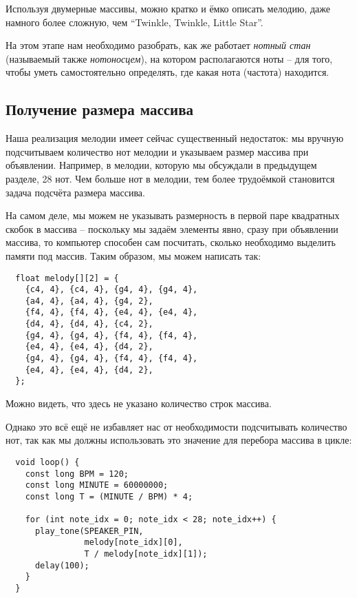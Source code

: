 \documentclass[../sparc.tex]{subfiles}
\begin{document}
Используя двумерные массивы, можно кратко и ёмко описать мелодию, даже намного
более сложную, чем ``Twinkle, Twinkle, Little Star''.

На этом этапе нам необходимо разобрать, как же работает \emph{нотный стан}
(называемый также \emph{нотоносцем}), на котором располагаются ноты -- для того,
чтобы уметь самостоятельно определять, где какая нота (частота) находится.

\subsection{Получение размера массива}

Наша реализация мелодии имеет сейчас существенный недостаток: мы вручную
подсчитываем количество нот мелодии и указываем размер массива при объявлении.
Например, в мелодии, которую мы обсуждали в предыдущем разделе, 28 нот.  Чем
больше нот в мелодии, тем более трудоёмкой становится задача подсчёта размера
массива.

На самом деле, мы можем не указывать размерность в первой паре квадратных скобок
в массива -- поскольку мы задаём элементы явно, сразу при объявлении массива, то
компьютер способен сам посчитать, сколько необходимо выделить памяти под массив.
Таким образом, мы можем написать так:

\begin{verbatim}
  float melody[][2] = {
    {c4, 4}, {c4, 4}, {g4, 4}, {g4, 4},
    {a4, 4}, {a4, 4}, {g4, 2},
    {f4, 4}, {f4, 4}, {e4, 4}, {e4, 4},
    {d4, 4}, {d4, 4}, {c4, 2},
    {g4, 4}, {g4, 4}, {f4, 4}, {f4, 4},
    {e4, 4}, {e4, 4}, {d4, 2},
    {g4, 4}, {g4, 4}, {f4, 4}, {f4, 4},
    {e4, 4}, {e4, 4}, {d4, 2},
  };
\end{verbatim}

Можно видеть, что здесь не указано количество строк массива.

Однако это всё ещё не избавляет нас от необходимости подсчитывать количество
нот, так как мы должны использовать это значение для перебора массива в цикле:

\begin{verbatim}
  void loop() {
    const long BPM = 120;
    const long MINUTE = 60000000;
    const long T = (MINUTE / BPM) * 4;

    for (int note_idx = 0; note_idx < 28; note_idx++) {
      play_tone(SPEAKER_PIN,
                melody[note_idx][0],
                T / melody[note_idx][1]);
      delay(100);
    }
  }
\end{verbatim}
\end{document}
